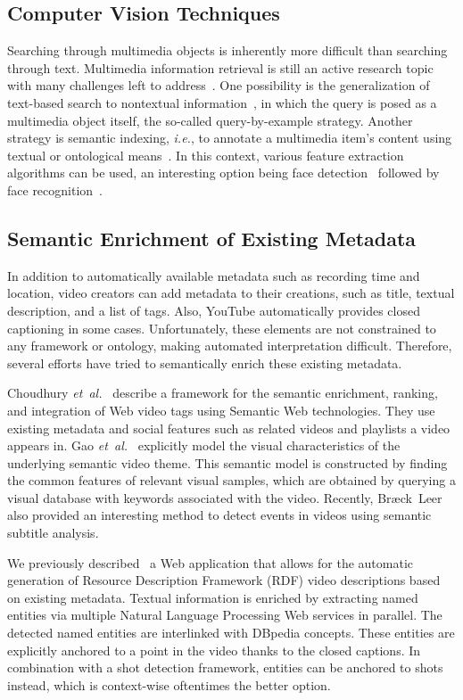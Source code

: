 \documentclass[runningheads,a4paper]{llncs}
\begin{document}
\subsection{Computer Vision Techniques}
Searching through multimedia objects is inherently more difficult than searching through text.
Multimedia information retrieval is still an active research topic with many challenges left to address~\cite{Hanjalic:2008}.
One possibility is the generalization of text-based search to nontextual information~\cite{Sivic:2008}, in which the query is posed as a multimedia object itself, the so-called query-by-example strategy.
Another strategy is semantic indexing, \emph{i.e.}, to annotate a multimedia item's content using textual or ontological means~\cite{Hauptmann:2008}.
In this context, various feature extraction algorithms can be used, an interesting option being face detection~\cite{ViolaJones} followed by face recognition~\cite{Verstockt:2009}.

\subsection{Semantic Enrichment of Existing Metadata}
In addition to automatically available metadata such as recording time and location, video creators can add metadata to their creations, such as title, textual description, and a list of tags. Also, YouTube automatically provides closed captioning in some cases. Unfortunately, these elements are not constrained to any framework or ontology, making automated interpretation difficult. Therefore, several efforts have tried to semantically enrich these existing metadata.

Choudhury \emph{et~al.}~\cite{Choudhury:YouTube} describe a framework for the semantic enrichment, ranking, and integration of Web video tags using Semantic Web technologies. They use existing metadata and social features such as related videos and playlists a video appears in.
Gao \emph{et~al.}~\cite{Gao:2009} explicitly model the visual characteristics of the underlying semantic video theme. This semantic model is constructed by finding the common features of relevant visual samples, which are obtained by querying a visual database with keywords associated with the video.
Recently, Br{\ae}ck~Leer~\cite{BraeckLeer:2011} also provided an interesting method to detect events in videos using semantic subtitle analysis.

We previously described~\cite{semwebvid} a Web application that allows for the automatic generation of Resource Description Framework (RDF) video descriptions based on existing metadata. Textual information is enriched by extracting named entities via multiple Natural Language Processing Web services in parallel. The detected named entities are interlinked with DBpedia concepts. These entities are explicitly anchored to a point in the video thanks to the closed captions. In combination with a shot detection framework, entities can be anchored to shots instead, which is context-wise oftentimes the better option.
\end{document}
